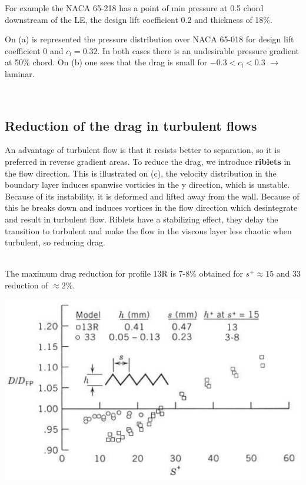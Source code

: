 	For example the NACA 65-218 has a point of min pressure at 0.5 chord downstream of the LE, the design lift coefficient 0.2 and thickness of 18\%. 
	
	On (a) is represented the pressure distribution over NACA 65-018 for design lift coefficient 0 and $c_l=0.32$. In both cases there is an undesirable pressure gradient at 50\% chord. On (b) one sees that the drag is small for $-0.3 < c_l <0.3$ $\rightarrow$ laminar. 

\ \\[5cm]
\subsection{Reduction of the drag in turbulent flows}
	An advantage of turbulent flow is that it resists better to separation, so it is preferred in reverse gradient areas. To reduce the drag, we introduce \textbf{riblets} in the flow direction.  This is illustrated on (c), the velocity distribution in the boundary layer induces spanwise vorticies in the y direction, which is unstable. Because of its instability, it is deformed and lifted away from the wall. Because of this he breaks down and induces vortices in the flow direction which desintegrate and result in turbulent flow. Riblets have a stabilizing effect, they delay the transition to turbulent and make the flow in the viscous layer less chaotic when turbulent, so reducing drag.  
	
	\ \\ 
	
	The maximum drag reduction for profile 13R is 7-8\% obtained for $s^+ \approx 15$ and 33 reduction of $\approx 2\%$. 
	\\
	
	\begin{center}
	\includegraphics[scale=0.2]{ch4/7}
	\end{center}
	